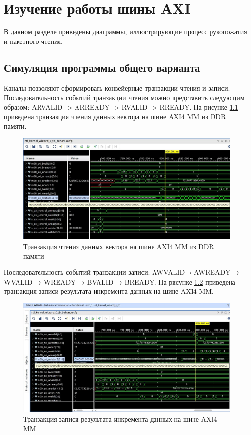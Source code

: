 \setcounter{chapter}{0}

\chapter{Изучение работы шины AXI}

В данном разделе приведены диаграммы, иллюстрирующие процесс рукопожатия и пакетного чтения.

\section{Симуляция программы общего варианта}
Каналы позволяют сформировать конвейерные транзакции чтения и записи. Последовательность событий транзакции чтения можно представить следующим образом: ARVALID -> ARREADY -> RVALID -> RREADY. На рисунке \ref{readTrans} приведена транзакция чтения данных вектора на шине AXI4 MM из DDR памяти.

\begin{figure}[h!p]
	\centering
	\includegraphics[width = \linewidth]{inc/read.png}
	\caption{Транзакция чтения данных вектора на шине AXI4 MM из DDR памяти}
	\label{readTrans}
\end{figure}
\newpage
Последовательность событий транзакции записи: AWVALID→ AWREADY → WVALID → WREADY → BVALID → BREADY. На рисунке \ref{writeTrans} приведена транзакция записи результата инкремента данных на шине AXI4 MM.

\begin{figure}[h!p]
	\centering
	\includegraphics[width = \linewidth]{inc/write.png}
	\caption{Транзакция записи результата инкремента данных на шине AXI4 MM}
	\label{writeTrans}
\end{figure}

